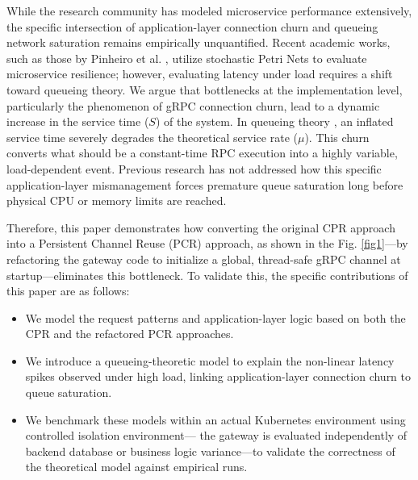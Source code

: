 \documentclass{ieeeaccess}
\begin{document}
While the research community has modeled microservice performance extensively, the specific intersection of application-layer connection churn and queueing network saturation remains empirically unquantified. Recent academic works, such as those by Pinheiro et al. \cite{pinheiro2024performance}, utilize stochastic Petri Nets to evaluate microservice resilience; however, evaluating latency under load requires a shift toward queueing theory. We argue that bottlenecks at the implementation level, particularly the phenomenon of gRPC connection churn, lead to a dynamic increase in the service time ($S$) of the system. In queueing theory \cite{DAuria2021AnMQA}, an inflated service time severely degrades the theoretical service rate ($\mu$). This churn converts what should be a constant-time RPC execution into a highly variable, load-dependent event. Previous research has not addressed how this specific application-layer mismanagement forces premature queue saturation long before physical CPU or memory limits are reached.

Therefore, this paper demonstrates how converting the original CPR approach into a Persistent Channel Reuse (PCR) approach, as shown in the Fig. \ref{fig1}—by refactoring the gateway code to initialize a global, thread-safe gRPC channel at startup—eliminates this bottleneck. To validate this, the specific contributions of this paper are as follows:

\begin{itemize}
    \item We model the request patterns and application-layer logic based on both the CPR and the refactored PCR approaches.
    
    \item We introduce a queueing-theoretic model to explain the non-linear latency spikes observed under high load, linking application-layer connection churn to queue saturation.
    
    \item We benchmark these models within an actual Kubernetes environment using controlled isolation environment— the gateway is evaluated independently of backend database or business logic variance—to validate the correctness of the theoretical model against empirical runs.
\end{itemize}

\end{document}
